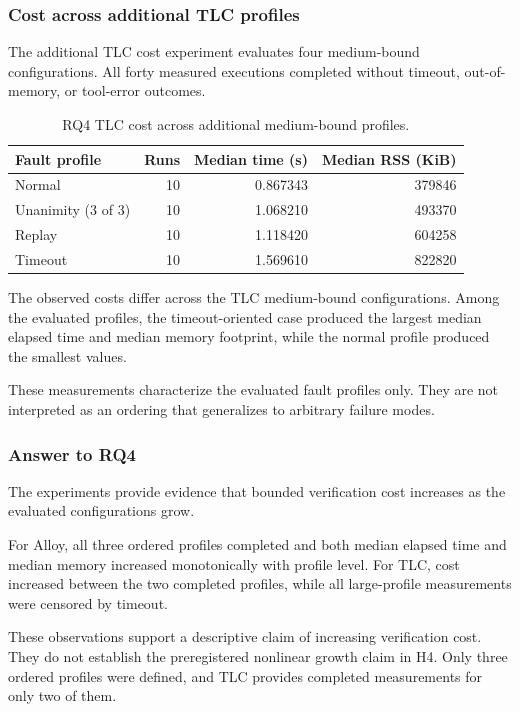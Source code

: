 \subsubsection{Cost across additional TLC profiles}
\label{subsubsec:rq4-fault-cost}

The additional TLC cost experiment evaluates four medium-bound
configurations. All forty measured executions completed without
timeout, out-of-memory, or tool-error outcomes.

\begin{table}[htbp]
\centering
\small
\caption{RQ4 TLC cost across additional medium-bound profiles.}
\label{tab:rq4-fault-cost}
\begin{tabular}{lrrr}
\hline
Fault profile &
Runs &
Median time (s) &
Median RSS (KiB) \\
\hline
Normal               & 10 & 0.867343 & 379846 \\
Unanimity (3 of 3)  & 10 & 1.068210 & 493370 \\
Replay               & 10 & 1.118420 & 604258 \\
Timeout              & 10 & 1.569610 & 822820 \\
\hline
\end{tabular}
\end{table}

The observed costs differ across the TLC medium-bound configurations. Among the evaluated profiles, the
timeout-oriented case produced the largest median elapsed time and
median memory footprint, while the normal profile produced the
smallest values.

These measurements characterize the evaluated fault profiles only.
They are not interpreted as an ordering that generalizes to arbitrary
failure modes.

\subsubsection{Answer to RQ4}
\label{subsubsec:rq4-answer}

The experiments provide evidence that bounded verification cost
increases as the evaluated configurations grow.

For Alloy, all three ordered profiles completed and both median elapsed
time and median memory increased monotonically with profile level.
For TLC, cost increased between the two completed profiles, while all
large-profile measurements were censored by timeout.

These observations support a descriptive claim of increasing
verification cost. They do not establish the preregistered nonlinear
growth claim in H4. Only three ordered profiles were defined, and TLC
provides completed measurements for only two of them.

